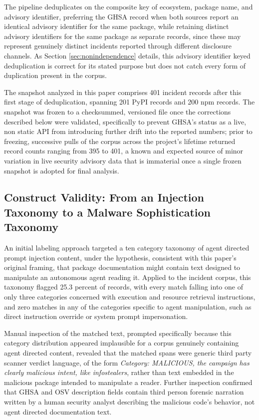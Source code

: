 \documentclass[journal]{IEEEtran}
\begin{document}
The pipeline deduplicates on the composite key of ecosystem, package name, and advisory identifier, preferring the GHSA record when both sources report an identical advisory identifier for the same package, while retaining distinct advisory identifiers for the same package as separate records, since these may represent genuinely distinct incidents reported through different disclosure channels. As Section \ref{sec:nonindependence} details, this advisory identifier keyed deduplication is correct for its stated purpose but does not catch every form of duplication present in the corpus.

The snapshot analyzed in this paper comprises 401 incident records after this first stage of deduplication, spanning 201 PyPI records and 200 npm records. The snapshot was frozen to a checksummed, versioned file once the corrections described below were validated, specifically to prevent GHSA's status as a live, non static API from introducing further drift into the reported numbers; prior to freezing, successive pulls of the corpus across the project's lifetime returned record counts ranging from 395 to 401, a known and expected source of minor variation in live security advisory data that is immaterial once a single frozen snapshot is adopted for final analysis.

\subsection{Construct Validity: From an Injection Taxonomy to a Malware Sophistication Taxonomy}
\label{sec:construct}

An initial labeling approach targeted a ten category taxonomy of agent directed prompt injection content, under the hypothesis, consistent with this paper's original framing, that package documentation might contain text designed to manipulate an autonomous agent reading it. Applied to the incident corpus, this taxonomy flagged 25.3 percent of records, with every match falling into one of only three categories concerned with execution and resource retrieval instructions, and zero matches in any of the categories specific to agent manipulation, such as direct instruction override or system prompt impersonation.

Manual inspection of the matched text, prompted specifically because this category distribution appeared implausible for a corpus genuinely containing agent directed content, revealed that the matched spans were generic third party scanner verdict language, of the form \textit{Category: MALICIOUS, the campaign has clearly malicious intent, like infostealers}, rather than text embedded in the malicious package intended to manipulate a reader. Further inspection confirmed that GHSA and OSV description fields contain third person forensic narration written by a human security analyst describing the malicious code's behavior, not agent directed documentation text.
\end{document}
